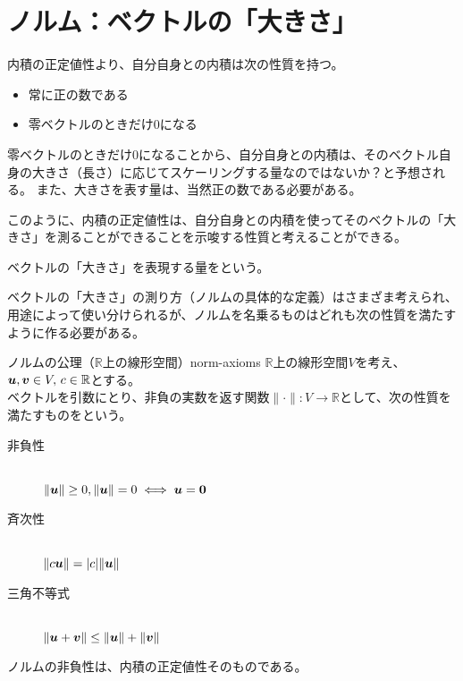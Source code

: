 \documentclass[../../../topic_linear-algebra]{subfiles}
\begin{document}
\sectionline
\section{ノルム：ベクトルの「大きさ」}

内積の正定値性より、自分自身との内積は次の性質を持つ。
\begin{itemize}
  \item 常に正の数である
  \item 零ベクトルのときだけ0になる
\end{itemize}

零ベクトルのときだけ0になることから、自分自身との内積は、そのベクトル自身の大きさ（長さ）に応じてスケーリングする量なのではないか？と予想される。
また、大きさを表す量は、当然正の数である必要がある。

\br

このように、内積の正定値性は、自分自身との内積を使ってそのベクトルの「大きさ」を測ることができることを示唆する性質と考えることができる。

\br

ベクトルの「大きさ」を表現する量をという。

\br

ベクトルの「大きさ」の測り方（ノルムの具体的な定義）はさまざま考えられ、用途によって使い分けられるが、ノルムを名乗るものはどれも次の性質を満たすように作る必要がある。

\begin{definition}{ノルムの公理（$\mathbb{R}$上の線形空間）}{norm-axioms}
  $\mathbb{R}$上の線形空間$V$を考え、$\vb*{u}, \vb*{v} \in V,\, c \in \mathbb{R} $とする。\\
  ベクトルを引数にとり、非負の実数を返す関数$\|\cdot\|: V \to \mathbb{R}$として、次の性質を満たすものをという。
  \begin{description}
    \item[非負性]~\\
          $\|\vb*{u}\| \geq 0, \|\vb*{u}\| = 0 \iff \vb*{u} = \vb*{0}$
    \item[斉次性]~\\
          $\|c\vb*{u}\| = |c|\|\vb*{u}\|$
    \item[三角不等式]~\\
          $\|\vb*{u} + \vb*{v}\| \leq \|\vb*{u}\| + \|\vb*{v}\|$
  \end{description}
\end{definition}

ノルムの非負性は、内積の正定値性そのものである。
\end{document}
